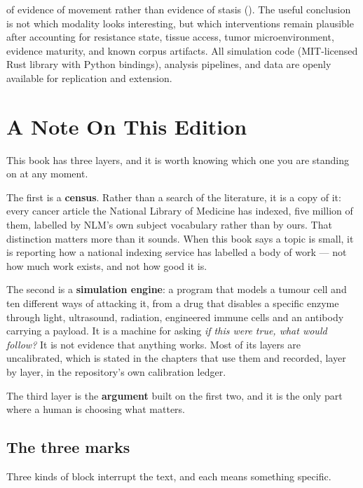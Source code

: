 \documentclass[11pt,twoside,openright]{report}
\begin{document}
of evidence of movement rather than evidence of stasis (). The useful conclusion is not which modality looks interesting, but which interventions remain plausible after accounting for resistance state, tissue access, tumor microenvironment, evidence maturity, and known corpus artifacts. All simulation code (MIT-licensed Rust library with Python bindings), analysis pipelines, and data are openly available for replication and extension.

\cleardoublepage
\tableofcontents

\chapter*{A Note On This Edition}
This book has three layers, and it is worth knowing which one you are standing on at any moment.

The first is a \textbf{census}. Rather than a search of the literature, it is a copy of it: every cancer article the National Library of Medicine has indexed, five million of them, labelled by NLM's own subject vocabulary rather than by ours. That distinction matters more than it sounds. When this book says a topic is small, it is reporting how a national indexing service has labelled a body of work --- not how much work exists, and not how good it is.

The second is a \textbf{simulation engine}: a program that models a tumour cell and ten different ways of attacking it, from a drug that disables a specific enzyme through light, ultrasound, radiation, engineered immune cells and an antibody carrying a payload. It is a machine for asking \textit{if this were true, what would follow?} It is not evidence that anything works. Most of its layers are uncalibrated, which is stated in the chapters that use them and recorded, layer by layer, in the repository's own calibration ledger.

The third layer is the \textbf{argument} built on the first two, and it is the only part where a human is choosing what matters.

\section*{The three marks}

Three kinds of block interrupt the text, and each means something specific.
\end{document}
